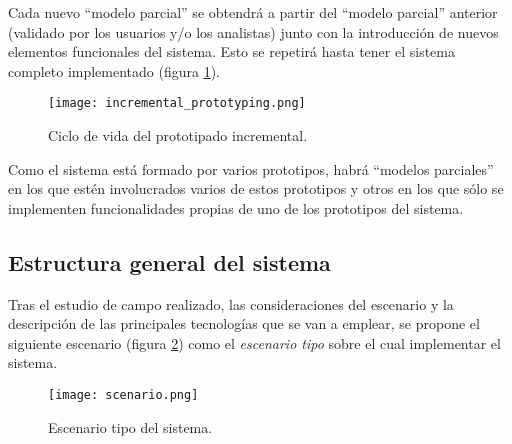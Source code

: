 Cada nuevo ``modelo parcial'' se obtendrá a partir del ``modelo parcial''
anterior (validado por los usuarios y/o los analistas) junto con la
introducción de nuevos elementos funcionales del sistema. Esto se repetirá
hasta tener el sistema completo implementado (figura
\ref{fig:incremental_prototyping}).

\begin{figure}[!h]
  \begin{center}
    \texttt{[image: incremental\_prototyping.png]}
    \caption{Ciclo de vida del prototipado incremental.}
    \label{fig:incremental_prototyping}
  \end{center}
\end{figure}

Como el sistema está formado por varios prototipos, habrá ``modelos parciales''
en los que estén involucrados varios de estos prototipos y otros en los que
sólo se implementen funcionalidades propias de uno de los prototipos del
sistema.

  \subsection{Estructura general del sistema}
Tras el estudio de campo realizado, las consideraciones del escenario y la
descripción de las principales tecnologías que se van a emplear, se propone
el siguiente escenario (figura \ref{fig:scenario}) como el \emph{escenario
tipo} sobre el cual implementar el sistema.

\begin{figure}[!h]
  \begin{center}
    \texttt{[image: scenario.png]}
    \caption{Escenario tipo del sistema.}
    \label{fig:scenario}
  \end{center}
\end{figure}

